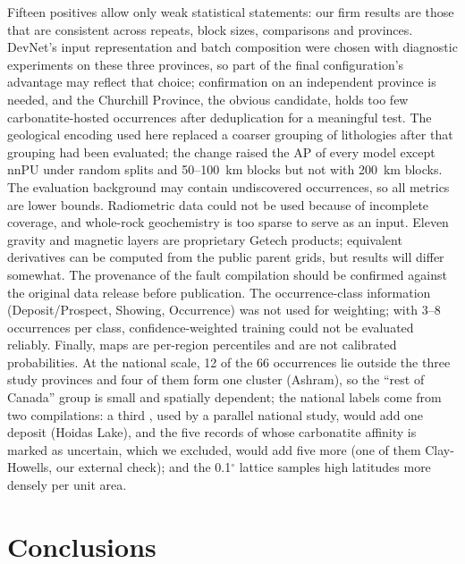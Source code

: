 \documentclass[pdflatex,sn-apa]{sn-jnl}
\begin{document}
Fifteen positives allow only weak statistical statements: our firm results are those that are consistent across repeats, block sizes, comparisons and provinces. DevNet's input representation and batch composition were chosen with diagnostic experiments on these three provinces, so part of the final configuration's advantage may reflect that choice; confirmation on an independent province is needed, and the Churchill Province, the obvious candidate, holds too few carbonatite-hosted occurrences after deduplication for a meaningful test. The geological encoding used here replaced a coarser grouping of lithologies after that grouping had been evaluated; the change raised the AP of every model except nnPU under random splits and 50--100~km blocks but not with 200~km blocks. The evaluation background may contain undiscovered occurrences, so all metrics are lower bounds. Radiometric data could not be used because of incomplete coverage, and whole-rock geochemistry is too sparse to serve as an input. Eleven gravity and magnetic layers are proprietary Getech products; equivalent derivatives can be computed from the public parent grids, but results will differ somewhat. The provenance of the fault compilation should be confirmed against the original data release before publication. The occurrence-class information (Deposit/Prospect, Showing, Occurrence) was not used for weighting; with 3--8 occurrences per class, confidence-weighted training could not be evaluated reliably. Finally, maps are per-region percentiles and are not calibrated probabilities. At the national scale, 12 of the 66 occurrences lie outside the three study provinces and four of them form one cluster (Ashram), so the ``rest of Canada'' group is small and spatially dependent; the national labels come from two compilations: a third \citep{Huston2024}, used by a parallel national study, would add one deposit (Hoidas Lake), and the five records of \citet{Orris2018} whose carbonatite affinity is marked as uncertain, which we excluded, would add five more (one of them Clay-Howells, our external check); and the 0.1$^\circ$ lattice samples high latitudes more densely per unit area.

\section{Conclusions}\label{sec:conclusions}
\end{document}
